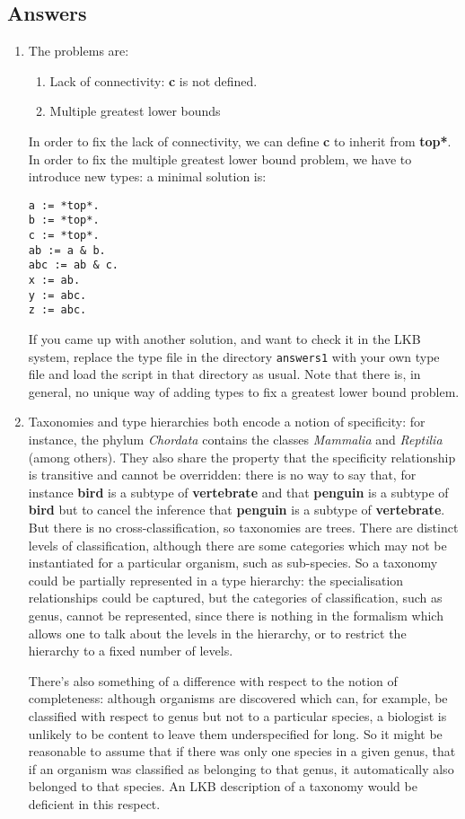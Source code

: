 \documentclass[12pt]{report}
\begin{document}
\subsection{Answers}
\begin{enumerate}
\item The problems are:
\begin{enumerate}
\item Lack of connectivity: {\bf c} is not defined.
\item Multiple greatest lower bounds
\end{enumerate}
In order to fix the lack of connectivity, we can define {\bf c} to
inherit from {\bf *top*}.  In order to fix the multiple
greatest lower bound problem, we have to introduce new types: a minimal
solution is:
\begin{verbatim}
a := *top*.
b := *top*.
c := *top*.
ab := a & b.
abc := ab & c.
x := ab.
y := abc.
z := abc.
\end{verbatim}
If you came up with another solution, and want to check it in the 
LKB system, replace the type file in the directory {\tt answers1}
with your own type file and load the script in that directory as usual.
Note that there is, in general, no unique way of adding types
to fix a greatest lower bound problem.
\item Taxonomies and type hierarchies both encode a notion
of specificity: for instance, the phylum {\it Chordata} contains
the classes {\it Mammalia} and {\it Reptilia} (among others).
They also share the property that the specificity relationship
is transitive and cannot be overridden: there is no way to say that, for instance
{\bf bird} is a subtype of {\bf vertebrate} and that
{\bf penguin} is a subtype of {\bf bird} but to cancel
the inference that {\bf penguin} is a subtype of {\bf vertebrate}.
But there is no cross-classification, so taxonomies are trees.
There are distinct levels of classification,
although there are some categories which may not be
instantiated for a particular organism, such as sub-species.
So a taxonomy could be partially represented in a type hierarchy:
the specialisation relationships could be captured, but
the categories of classification, such as genus,
cannot be represented, since
there is nothing in the formalism which allows one to
talk about the levels in the hierarchy, or to restrict the
hierarchy to a fixed number of levels.

There's also something of a difference with respect to the
notion of completeness: although organisms are discovered which
can, for example, be classified with respect to genus but not
to a particular species, a biologist is unlikely to be content to leave them
underspecified for long.  So it might be reasonable 
to assume that if there was only
one species in a given genus, that if an organism was classified as belonging
to that genus, it automatically also belonged to that species.
An LKB description of a taxonomy would be deficient in this respect.
\end{enumerate}
\end{document}
